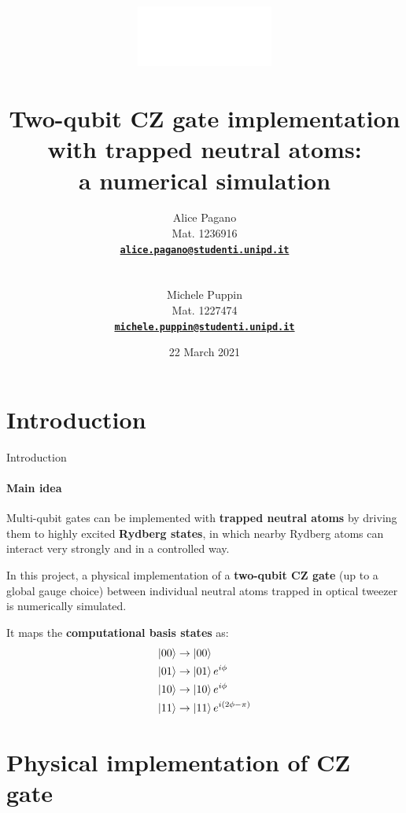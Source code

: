 \documentclass[8pt]{beamer}
\title[Two-qubit CZ gate with trapped neutral atoms]{
	\includegraphics[height=2cm]{images/logo/unipd_logo_white.png}\\
	~\\
	\textbf{ \Large
		Two-qubit CZ gate implementation with trapped neutral atoms: \\ a numerical simulation
	}
}
\institute{Quantum Information and Computing \\ (a.y. 2020/21) }
\author[Alice Pagano - Michele Puppin]{\small%
    \parbox{2.5cm}{Alice Pagano}\parbox{2.5cm}{Mat. 1236916} \parbox{3.8cm}{\bf\href{mailto:alice.pagano@studenti.unipd.it}{\texttt{\color{linkcolor}alice.pagano@studenti.unipd.it}}} 
    \\ \vspace{0.1cm}
    \parbox{2.5cm}{Michele Puppin}\parbox{2.5cm}{Mat. 1227474} \parbox{3.8cm}{\bf\href{mailto:michele.puppin@studenti.unipd.it}{\texttt{\color{linkcolor}michele.puppin@studenti.unipd.it}}}}
\date{22 March 2021}
\begin{document}
	\begin{frame}[plain]
	    \titlepage
	\end{frame} 

    \setcounter{framenumber}{0}

%
%		


	\section{Introduction}
	
	\begin{frame}{Introduction}
	\framesubtitle{Main idea}

    Multi-qubit gates can be implemented with \textbf{trapped neutral atoms} by driving them to highly excited \textbf{Rydberg states}, in which nearby Rydberg atoms can interact very strongly and in a controlled way. 
    
    \bigskip
    
    In this project, a physical implementation of a \textbf{two-qubit CZ gate} \cite{PhysRevLett.123.170503} (up to a global gauge choice) between individual neutral atoms trapped in optical tweezer is numerically simulated.
 
    \bigskip  
    
    It maps the \textbf{computational basis states} as: 
        \begin{equation}
            \begin{aligned}
                \ket{00} & \rightarrow \ket{00} \\
                \ket{01} & \rightarrow \ket{01} e^{i\phi} \\
                \ket{10} & \rightarrow \ket{10} e^{i\phi}\\
                \ket{11} & \rightarrow \ket{11} e^{i(2\phi-\pi)}\\
            \end{aligned}
            \label{eq:CZ-gate-map}
        \end{equation}
	
	\end{frame}
	
	
	
	\section{Physical implementation of CZ gate}
	
\end{document}
